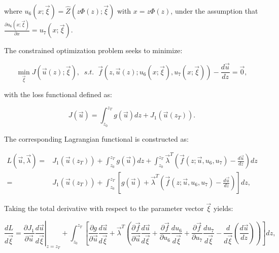 \documentclass[11pt]{article}
\begin{document}
where ${u_6}\left( {x;\vec \xi  } \right) = \widehat Z\left( {z\Phi \left( z \right);\vec \xi  } \right)$ with $ x = z\Phi \left( z \right)$, {\color{blue} under the assumption that $ \frac{{\partial {u_6}\left( {x;\vec \xi } \right)}}{{\partial x}} = {u_7}\left( {x;\vec \xi } \right) $}. 


The constrained optimization problem seeks to minimize:

\begin{equation}
	\mathop {\min }\limits_{\vec \xi } J\left( {\vec u\left( z \right)}; \vec{\xi} \right),\;\;s.t.\;\;\vec f\left( {z,\vec u\left( z \right);{u_6}\left( {x;\vec \xi  } \right),{u_7}\left( {x;\vec \xi  } \right)} \right) - \frac{{d\vec u}}{{dz}} = \vec 0,
\end{equation}

with the loss functional defined as:

\begin{equation}
	J\left( {\vec u} \right) = \int_{{z_0}}^{{z_T}} {g\left( \vec u \right)dz}  + {J_1}\left( {\vec u \left( {{z_T}} \right)} \right) .
\end{equation}


The corresponding Lagrangian functional is constructed as:

\begin{equation}
	\begin{split}
		L\left( {\vec u,\vec \lambda  } \right) = & {J_1}\left( {\vec u\left( {{z_T}} \right)} \right) + \int_{{z_0}}^{{z_T}} {g\left( {\vec u} \right)dz}  + \int_{{z_0}}^{{z_T}} {{{\vec \lambda }^T}\left( {\vec f\left( {z;\vec u,{u_6},{u_7}} \right) - \frac{{d\vec u}}{{dz}}} \right)dz}    \\
		= & {J_1}\left( {\vec u\left( {{z_T}} \right)} \right) + \int_{{z_0}}^{{z_T}} {\left[ {g\left( {\vec u} \right) + {{\vec \lambda }^T}\left( {\vec f\left( {z;\vec u,{u_6},{u_7}} \right) - \frac{{d\vec u}}{{dz}}} \right)} \right]dz} ,
	\end{split}
\end{equation}

Taking the total derivative with respect to the parameter vector  $\vec \xi$ yields:

\begin{equation}
	\frac{{dL}}{{d\vec \xi }} = {\left. {\frac{{\partial {J_1}}}{{\partial \vec u}}\frac{{d\vec u}}{{d\vec \xi }}} \right|_{z = {z_T}}} + \int_{{z_0}}^{{z_T}} {\left[ {\frac{{\partial g}}{{\partial \vec u}}\frac{{d\vec u}}{{d\vec \xi }} + {{\vec \lambda }^T}\left( {\frac{{\partial \vec f}}{{\partial \vec u}}\frac{{d\vec u}}{{d\vec \xi }} + \frac{{\partial \vec f}}{{\partial {u_6}}}\frac{{d{u_6}}}{{d\vec \xi }} + \frac{{\partial \vec f}}{{\partial {u_7}}}\frac{{d{u_7}}}{{d\vec \xi }} - \frac{d}{{d\vec \xi }}\left( {\frac{{d\vec u}}{{dz}}} \right)} \right)} \right]dz},
	\label{eq006}
\end{equation}
\end{document}
